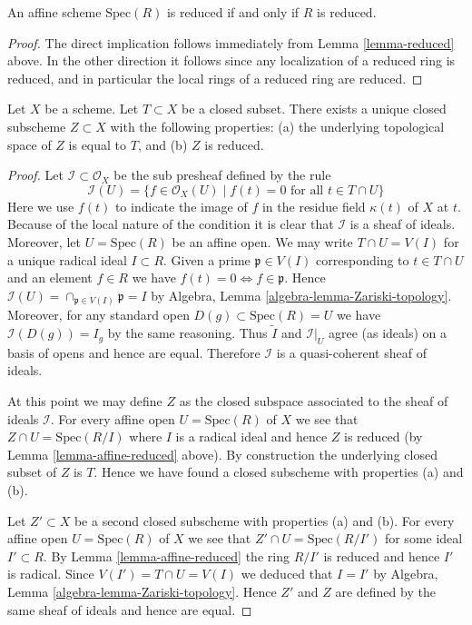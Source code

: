 \begin{lemma}
\label{lemma-affine-reduced}
An affine scheme $\text{Spec}(R)$ is reduced
if and only if $R$ is reduced.
\end{lemma}

\begin{proof}
The direct implication follows immediately from
Lemma \ref{lemma-reduced} above.
In the other direction it follows since any localization of
a reduced ring is reduced, and in particular the local rings
of a reduced ring are reduced.
\end{proof}

\begin{lemma}
\label{lemma-reduced-closed-subscheme}
Let $X$ be a scheme. Let $T \subset X$ be a closed subset.
There exists a unique closed subscheme $Z \subset X$ with
the following properties: (a) the underlying topological
space of $Z$ is equal to $T$, and (b) $Z$ is reduced.
\end{lemma}

\begin{proof}
Let $\mathcal{I} \subset \mathcal{O}_X$ be the sub presheaf
defined by the rule
$$
\mathcal{I}(U) = \{f \in \mathcal{O}_X(U) \mid
f(t) = 0\text{ for all }t \in T\cap U\}
$$
Here we use $f(t)$ to indicate the image of
$f$ in the residue field $\kappa(t)$ of $X$ at $t$.
Because of the local nature of the condition it is
clear that $\mathcal{I}$ is a sheaf of ideals. Moreover,
let $U = \text{Spec}(R)$ be an affine open.
We may write $T \cap U = V(I)$ for a unique radical
ideal $I \subset R$. Given a prime $\mathfrak p \in V(I)$
corresponding to $t \in T \cap U$ and an element $f \in R$ we have
$f(t) = 0 \Leftrightarrow f \in \mathfrak p$.
Hence $\mathcal{I}(U) = \cap_{\mathfrak p \in V(I)} \mathfrak p
= I$ by Algebra, Lemma \ref{algebra-lemma-Zariski-topology}.
Moreover, for any standard open $D(g) \subset \text{Spec}(R) = U$
we have $\mathcal{I}(D(g)) = I_g$ by the same reasoning.
Thus $\widetilde I$ and $\mathcal{I}|_U$ agree (as ideals)
on a basis of opens and hence are equal. Therefore
$\mathcal{I}$ is a quasi-coherent sheaf of ideals.

\medskip\noindent
At this point we may define $Z$ as the closed subspace
associated to the sheaf of ideals $\mathcal{I}$. For every
affine open $U = \text{Spec}(R)$ of $X$ we see that
$Z \cap U = \text{Spec}(R/I)$ where $I$ is a radical ideal and
hence $Z$ is reduced (by Lemma \ref{lemma-affine-reduced} above).
By construction the underlying closed subset of $Z$ is $T$.
Hence we have found a closed subscheme with properties (a) and (b).

\medskip\noindent
Let $Z' \subset X$ be a second closed subscheme with properties (a) and (b).
For every affine open $U = \text{Spec}(R)$ of $X$ we see that
$Z' \cap U = \text{Spec}(R/I')$ for some ideal $I' \subset R$.
By Lemma \ref{lemma-affine-reduced} the ring $R/I'$ is
reduced and hence $I'$ is radical. Since $V(I') = T \cap U = V(I)$
we deduced that $I = I'$ by
Algebra, Lemma \ref{algebra-lemma-Zariski-topology}.
Hence $Z'$ and $Z$ are defined by the same sheaf of ideals
and hence are equal.
\end{proof}

